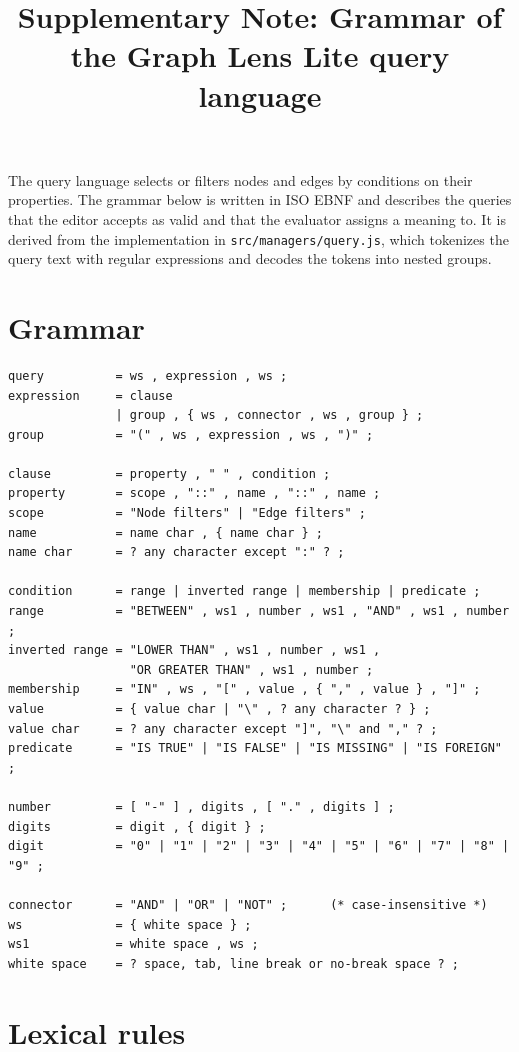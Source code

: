 \documentclass[10pt]{article}
\title{Supplementary Note: Grammar of the Graph Lens Lite query language}
\date{}
\begin{document}
\maketitle

The query language selects or filters nodes and edges by conditions on their
properties. The grammar below is written in ISO EBNF and describes the queries
that the editor accepts as valid and that the evaluator assigns a meaning to.
It is derived from the implementation in \texttt{src/managers/query.js}, which
tokenizes the query text with regular expressions and decodes the tokens into
nested groups.

\section*{Grammar}

\begin{lstlisting}
query          = ws , expression , ws ;
expression     = clause
               | group , { ws , connector , ws , group } ;
group          = "(" , ws , expression , ws , ")" ;

clause         = property , " " , condition ;
property       = scope , "::" , name , "::" , name ;
scope          = "Node filters" | "Edge filters" ;
name           = name char , { name char } ;
name char      = ? any character except ":" ? ;

condition      = range | inverted range | membership | predicate ;
range          = "BETWEEN" , ws1 , number , ws1 , "AND" , ws1 , number ;
inverted range = "LOWER THAN" , ws1 , number , ws1 ,
                 "OR GREATER THAN" , ws1 , number ;
membership     = "IN" , ws , "[" , value , { "," , value } , "]" ;
value          = { value char | "\" , ? any character ? } ;
value char     = ? any character except "]", "\" and "," ? ;
predicate      = "IS TRUE" | "IS FALSE" | "IS MISSING" | "IS FOREIGN" ;

number         = [ "-" ] , digits , [ "." , digits ] ;
digits         = digit , { digit } ;
digit          = "0" | "1" | "2" | "3" | "4" | "5" | "6" | "7" | "8" | "9" ;

connector      = "AND" | "OR" | "NOT" ;      (* case-insensitive *)
ws             = { white space } ;
ws1            = white space , ws ;
white space    = ? space, tab, line break or no-break space ? ;
\end{lstlisting}

\section*{Lexical rules}
\end{document}

